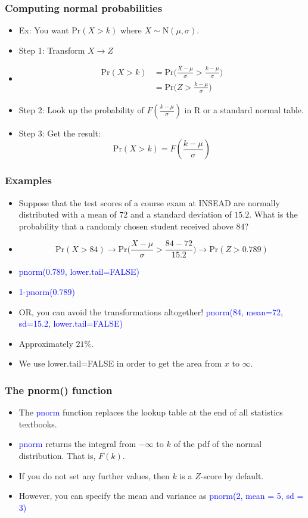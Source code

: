 \documentclass[xcolor=dvipsnames, 9pt]{beamer} %
\begin{document}
\begin{frame}
\frametitle{Computing normal probabilities}
\begin{itemize}
\item Ex: You want $\textrm{Pr}(X > k)$ where $X \sim \textrm{N}(\mu, \sigma)$. 
\item \textcolor{dark_red}{Step 1}: Transform $X \rightarrow Z$
\item[]
\begin{align*}
\textrm{Pr}(X > k)
&= \textrm{Pr} \bigg( \frac{X - \mu}{\sigma} > \frac{k - \mu}{\sigma} \bigg) \\
&= \textrm{Pr} \bigg( Z > \frac{k - \mu}{\sigma} \bigg)
\end{align*}
\item \textcolor{dark_red}{Step 2}: Look up the probability of $F(\frac{k - \mu}{\sigma})$ in \textsf{R} or a standard normal table. 
\item \textcolor{dark_red}{Step 3}: Get the result: $$ \textrm{Pr}(X > k) = F( \frac{k - \mu}{\sigma}) $$
\end{itemize}
\end{frame}

\begin{frame}
\frametitle{Examples}
\begin{itemize}
\item Suppose that the test scores of a course exam at INSEAD are normally distributed with a mean of $72$ and a standard deviation of $15.2$. What is the probability that a randomly chosen student received above $84$?
\item[]
$$ \textrm{Pr}(X > 84) \rightarrow \textrm{Pr} \bigg( \frac{X - \mu}{\sigma} > \frac{84 - 72}{15.2} \bigg) \rightarrow \textrm{Pr}(Z > 0.789) $$
\item \textcolor{blue}{pnorm(0.789, lower.tail=FALSE)}
\item \textcolor{blue}{1-pnorm(0.789)}
\item OR, you can avoid the transformations altogether! \textcolor{blue}{pnorm(84, mean=72, sd=15.2, lower.tail=FALSE)}
\item Approximately $21\%$.
\item We use lower.tail=FALSE in order to get the area from $x$ to $\infty$. 
\end{itemize}
\end{frame}

\begin{frame}
\frametitle{The pnorm() function}
\begin{itemize}
\item The \textcolor{blue}{pnorm} function replaces the lookup table at the end of all statistics textbooks. 
\item \textcolor{blue}{pnorm} returns the integral from $-\infty$ to $k$ of the pdf of the normal distribution. That is, $F(k)$. 
\item If you do not set any further values, then $k$ is a $Z$-score by default. 
\item However, you can specify the mean and variance as \textcolor{blue}{pnorm(2, mean = 5, sd = 3)}
\end{itemize}
\end{frame}
\end{document}
